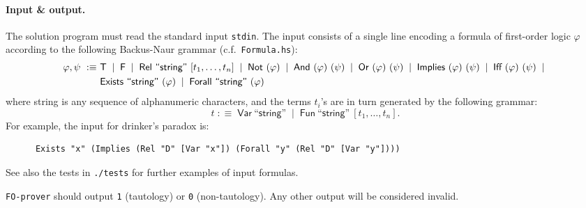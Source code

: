 \documentclass[zad,zawodnik,en]{sinol}
\newcommand{\sep}{\;\mid\;}
\begin{document}
    \paragraph{Input \& output.}
    The solution program must read the standard input \texttt{stdin}.
    The input consists of a single line encoding a formula of first-order logic $\varphi$ according to the following Backus-Naur grammar (c.f.~\texttt{Formula.hs}):
    \begin{align*}
      \varphi, \psi \ :\equiv\ 
      &
      \textsf T \sep
      \textsf F \sep
      \textsf{Rel}\ \textsf{``string''}\ [t_1, \dots, t_n] \sep
      \textsf{Not}\ (\varphi) \sep
      \textsf{And}\ (\varphi)\ (\psi) \sep
      \textsf{Or}\ (\varphi)\ (\psi) \sep
      \textsf{Implies}\ (\varphi)\ (\psi) \sep
      \textsf{Iff}\ (\varphi)\ (\psi) \sep \\
      &
      \textsf{Exists}\ \textsf{``string''}\ (\varphi) \sep
      \textsf{Forall}\ \textsf{``string''}\ (\varphi)
    \end{align*}
    where \textsf{string} is any sequence of alphanumeric characters,
    and the terms $t_i$'s are in turn generated by the following grammar:
    \[ t \;:\equiv\;
    \textsf{Var}\ \textsf{``string''} \sep
    \textsf{Fun}\ \textsf{``string''}\ [t_1, \dots, t_n].
    \]
    For example, the input for drinker's paradox is:
    \begin{verbatim}
      Exists "x" (Implies (Rel "D" [Var "x"]) (Forall "y" (Rel "D" [Var "y"])))\end{verbatim}
    See also the tests in \texttt{./tests} for further examples of input formulas.

    \texttt{FO-prover} should output \texttt{1} (tautology) or \texttt{0} (non-tautology).
    Any other output will be considered invalid.
\end{document}
